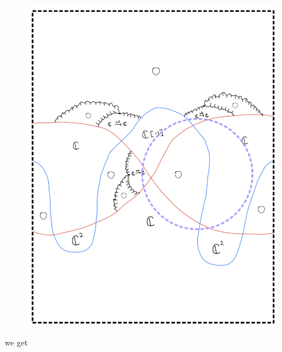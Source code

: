 \begin{enumerate}[label=(Step \arabic*)]
\begin{figure}[H]
    \centering
    \includegraphics[scale = 0.95]{diagrams/cobord8/4.png}
    \caption{}
    \label{fig:your-label}
\end{figure}

we get


\end{enumerate}
